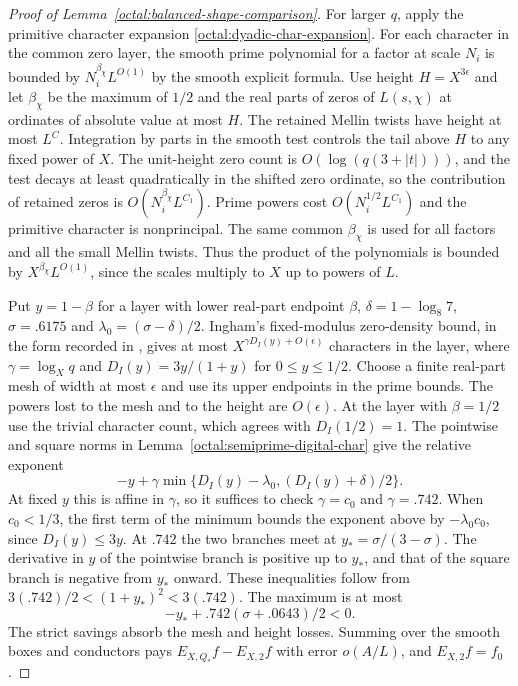 \documentclass[11pt,a4paper]{article}
\theoremstyle{paperplain}
\numberwithin{equation}{section}
\begin{document}
\begin{proof}[Proof of Lemma~\ref{octal:balanced-shape-comparison}]
For larger $q$, apply the primitive character expansion
\eqref{octal:dyadic-char-expansion}. For each character in the
common zero layer, the smooth prime polynomial for a factor at
scale $N_i$ is bounded by $N_i^{\beta_\chi}L^{O(1)}$ by the smooth explicit formula. Use height $H=X^{3\epsilon}$ and let
$\beta_\chi$ be the maximum of $1/2$ and the real parts of zeros of
$L(s,\chi)$ at ordinates of absolute value at most $H$. The retained
Mellin twists have height at most $L^C$. Integration by parts in the
smooth test controls the tail above $H$ to any fixed power of $X$. The
unit-height zero count is $O(\log(q(3+|t|)))$, and the test decays at
least quadratically in the shifted zero ordinate, so the contribution
of retained zeros is $O(N_i^{\beta_\chi}L^{C_1})$. Prime powers cost
$O(N_i^{1/2}L^{C_1})$ and the primitive character is nonprincipal. The same common
$\beta_\chi$ is used for all factors and all the small Mellin
twists. Thus the product of the polynomials is bounded by
$X^{\beta_\chi}L^{O(1)}$, since the scales multiply to $X$ up to
powers of $L$.

Put $y=1-\beta$ for a layer with lower real-part endpoint $\beta$,
$\delta=1-\log_8 7$, $\sigma=.6175$ and $\lambda_0=(\sigma-\delta)/2$.
Ingham's fixed-modulus zero-density bound, in the form recorded in
\cite[(1.4)]{ChenGuptaLi2026}, gives at most
$X^{\gamma D_I(y)+O(\epsilon)}$ characters in the layer, where
$\gamma=\log_X q$ and $D_I(y)=3y/(1+y)$ for $0\le y\le1/2$.
Choose a finite real-part mesh of width at most $\epsilon$ and use its
upper endpoints in the prime bounds. The powers lost to the mesh and
to the height are $O(\epsilon)$. At the layer
with $\beta=1/2$ use the trivial character count, which agrees
with $D_I(1/2)=1$. The pointwise and square norms in
Lemma~\ref{octal:semiprime-digital-char} give the relative exponent
\[
 -y+\gamma\min\{D_I(y)-\lambda_0,(D_I(y)+\delta)/2\}.
\]
At fixed $y$ this is affine in $\gamma$, so it suffices to check
$\gamma=c_0$ and $\gamma=.742$. When $c_0<1/3$, the first term
of the minimum bounds the exponent above by $-\lambda_0c_0$,
since $D_I(y)\le3y$. At $.742$ the two branches meet at
$y_*=\sigma/(3-\sigma)$. The derivative in $y$ of the pointwise
branch is positive up to $y_*$, and that of the square branch
is negative from $y_*$ onward. These inequalities follow from
$3(.742)/2<(1+y_*)^2<3(.742)$. The maximum is at most
\[
    -y_*+.742(\sigma+.0643)/2<0.
\]
The strict savings absorb the mesh and height losses. Summing
over the smooth boxes and conductors pays $E_{X,Q_*}f-E_{X,2}f$
with error $o(A/L)$, and $E_{X,2}f=f_0$.


\end{proof}
\end{document}

